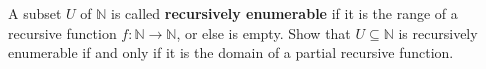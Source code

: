 A subset $U$ of $\mathbb{N}$ is called \textbf{recursively enumerable} if it is the range of a recursive function $f: \mathbb{N} \to \mathbb{N}$, or else is empty. Show that $U \subseteq \mathbb{N}$ is recursively enumerable if and only if it is the domain of a partial recursive function.
